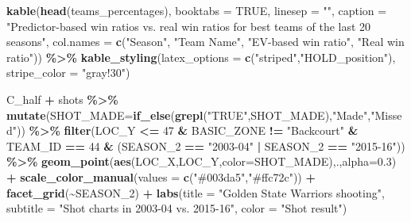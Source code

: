 \documentclass[
  12pt,
  a4paper,
]{article}
\newenvironment{Shaded}{\begin{snugshade}}{\end{snugshade}}
\newcommand{\AttributeTok}[1]{\textcolor[rgb]{0.13,0.29,0.53}{#1}}
\newcommand{\ConstantTok}[1]{\textcolor[rgb]{0.56,0.35,0.01}{#1}}
\newcommand{\DecValTok}[1]{\textcolor[rgb]{0.00,0.00,0.81}{#1}}
\newcommand{\FloatTok}[1]{\textcolor[rgb]{0.00,0.00,0.81}{#1}}
\newcommand{\FunctionTok}[1]{\textcolor[rgb]{0.13,0.29,0.53}{\textbf{#1}}}
\newcommand{\NormalTok}[1]{#1}
\newcommand{\SpecialCharTok}[1]{\textcolor[rgb]{0.81,0.36,0.00}{\textbf{#1}}}
\newcommand{\StringTok}[1]{\textcolor[rgb]{0.31,0.60,0.02}{#1}}
\begin{document}
\begin{Shaded}
\begin{Highlighting}[]
\FunctionTok{kable}\NormalTok{(}\FunctionTok{head}\NormalTok{(teams\_percentages), }\AttributeTok{booktabs =} \ConstantTok{TRUE}\NormalTok{, }\AttributeTok{linesep =} \StringTok{""}\NormalTok{,}
      \AttributeTok{caption =} \StringTok{"Predictor{-}based win ratios}
\StringTok{                 vs. real win ratios for best}
\StringTok{                 teams of the last 20 seasons"}\NormalTok{,}
      \AttributeTok{col.names =} \FunctionTok{c}\NormalTok{(}\StringTok{"Season"}\NormalTok{,}
                    \StringTok{"Team Name"}\NormalTok{,}
                    \StringTok{"EV{-}based win ratio"}\NormalTok{,}
                    \StringTok{"Real win ratio"}\NormalTok{)) }\SpecialCharTok{\%\textgreater{}\%}
  \FunctionTok{kable\_styling}\NormalTok{(}\AttributeTok{latex\_options =} \FunctionTok{c}\NormalTok{(}\StringTok{"striped"}\NormalTok{,}\StringTok{"HOLD\_position"}\NormalTok{),}
                \AttributeTok{stripe\_color =} \StringTok{"gray!30"}\NormalTok{)}

\NormalTok{C\_half }\SpecialCharTok{+}\NormalTok{ shots }\SpecialCharTok{\%\textgreater{}\%}
  \FunctionTok{mutate}\NormalTok{(}\AttributeTok{SHOT\_MADE=}\FunctionTok{if\_else}\NormalTok{(}\FunctionTok{grepl}\NormalTok{(}\StringTok{"TRUE"}\NormalTok{,SHOT\_MADE),}\StringTok{"Made"}\NormalTok{,}\StringTok{"Missed"}\NormalTok{)) }\SpecialCharTok{\%\textgreater{}\%}
  \FunctionTok{filter}\NormalTok{(LOC\_Y }\SpecialCharTok{\textless{}=} \DecValTok{47} \SpecialCharTok{\&}\NormalTok{ BASIC\_ZONE }\SpecialCharTok{!=} \StringTok{"Backcourt"} \SpecialCharTok{\&}\NormalTok{ TEAM\_ID }\SpecialCharTok{==} \DecValTok{44} \SpecialCharTok{\&}
\NormalTok{         (SEASON\_2 }\SpecialCharTok{==} \StringTok{"2003{-}04"} \SpecialCharTok{|}\NormalTok{ SEASON\_2 }\SpecialCharTok{==} \StringTok{"2015{-}16"}\NormalTok{)) }\SpecialCharTok{\%\textgreater{}\%}
  \FunctionTok{geom\_point}\NormalTok{(}\FunctionTok{aes}\NormalTok{(LOC\_X,LOC\_Y,}\AttributeTok{color=}\NormalTok{SHOT\_MADE),.,}\AttributeTok{alpha=}\FloatTok{0.3}\NormalTok{) }\SpecialCharTok{+}
  \FunctionTok{scale\_color\_manual}\NormalTok{(}\AttributeTok{values =} \FunctionTok{c}\NormalTok{(}\StringTok{"\#003da5"}\NormalTok{,}\StringTok{"\#ffc72c"}\NormalTok{)) }\SpecialCharTok{+}
  \FunctionTok{facet\_grid}\NormalTok{(}\SpecialCharTok{\textasciitilde{}}\NormalTok{SEASON\_2) }\SpecialCharTok{+}
  \FunctionTok{labs}\NormalTok{(}\AttributeTok{title =} \StringTok{"Golden State Warriors shooting"}\NormalTok{,}
       \AttributeTok{subtitle =} \StringTok{"Shot charts in 2003{-}04 vs. 2015{-}16"}\NormalTok{,}
       \AttributeTok{color =} \StringTok{"Shot result"}\NormalTok{)}


\end{Highlighting}
\end{Shaded}
\end{document}

